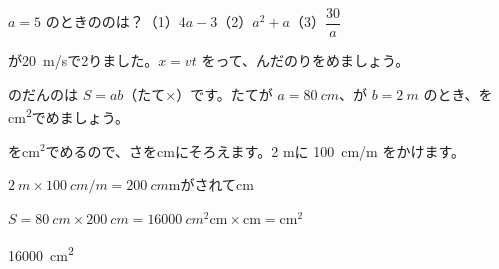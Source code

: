 \begingroup{}%
\noindent\begin{minipage}[t]{0.49\linewidth}
\begin{jibun}
$a=5$ のときののは？\quad（1）\nobreak $4a-3$\quad（2）\nobreak $a^2+a$\quad（3）\nobreak $\dfrac{30}{a}$
\end{jibun}
\end{minipage}\hfill
\begin{minipage}[t]{0.49\linewidth}
\begin{jibun}
が\qty{20}{m/s}で2りました。$x=vt$ をって、んだのりをめましょう。
\end{jibun}
\end{minipage}\par
\endgroup

\begin{reidai}
のだんのは $S=ab$（たて×）です。たてが $a=\qty{80}{cm}$、が $b=\qty{2}{m}$ のとき、を\unit{cm^2}でめましょう。\par
\kangaekata {}をcm$^2$でめるので、さをcmにそろえます。2 mに \qty{100}{cm/m} をかけます。\par
\shiki $\qty{2}{m}\times\qty{100}{cm/m}=\qty{200}{cm}$\quad mがされてcm\par
\hspace*{2.6\zw}$S=\qty{80}{cm}\times\qty{200}{cm}=\qty{16000}{cm^2}$\quad $\mathrm{cm}\times\mathrm{cm}=\mathrm{cm^2}$\par
\kotae \qty{16000}{cm^2}
\end{reidai}

